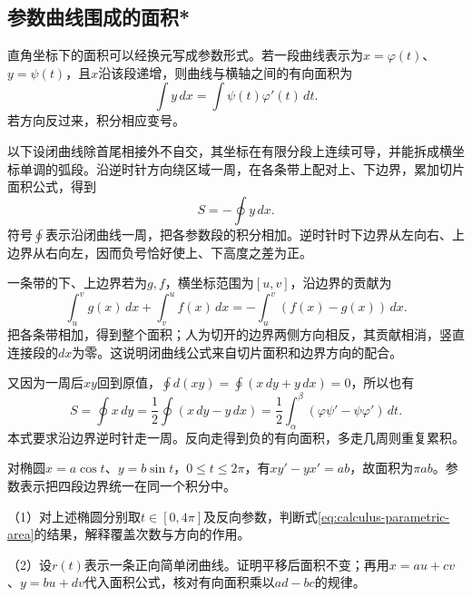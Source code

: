 \endgroup
\FloatBarrier
\newpage
\subsection{参数曲线围成的面积*}

直角坐标下的面积可以经换元写成参数形式。若一段曲线表示为\(x=\varphi(t)\)、\(y=\psi(t)\)，且\(x\)沿该段递增，则曲线与横轴之间的有向面积为
\begin{equation*}
 \int y\,dx=\int\psi(t)\varphi'(t)\,dt.
\end{equation*}
若方向反过来，积分相应变号。

以下设闭曲线除首尾相接外不自交，其坐标在有限分段上连续可导，并能拆成横坐标单调的弧段。沿逆时针方向绕区域一周，在各条带上配对上、下边界，累加切片面积公式，得到
\begin{equation*}
 S=-\oint y\,dx.
\end{equation*}
符号\(\oint\)表示沿闭曲线一周，把各参数段的积分相加。逆时针时下边界从左向右、上边界从右向左，因而负号恰好使上、下高度之差为正。

一条带的下、上边界若为\(g,f\)，横坐标范围为\([u,v]\)，沿边界的贡献为
\begin{equation*}
 \int_u^vg(x)\,dx+\int_v^uf(x)\,dx
 =-\int_u^v(f(x)-g(x))\,dx.
\end{equation*}
把各条带相加，得到整个面积；人为切开的边界两侧方向相反，其贡献相消，竖直连接段的\(dx\)为零。这说明闭曲线公式来自切片面积和边界方向的配合。

又因为一周后\(xy\)回到原值，\(\oint d(xy)=\oint(x\,dy+y\,dx)=0\)，所以也有
\begin{equation}\label{eq:calculus-parametric-area}
 S=\oint x\,dy=\frac12\oint(x\,dy-y\,dx)
 =\frac12\int_\alpha^\beta(\varphi\psi'-\psi\varphi')\,dt.
\end{equation}
本式要求沿边界逆时针走一周。反向走得到负的有向面积，多走几周则重复累积。

对椭圆\(x=a\cos t\)、\(y=b\sin t\)，\(0\le t\le2\pi\)，有\(xy'-yx'=ab\)，故面积为\(\pi ab\)。参数表示把四段边界统一在同一个积分中。

\begin{exercise}
\mbox{}\par\nobreak

（1）对上述椭圆分别取\(t\in[0,4\pi]\)及反向参数，判断式\eqref{eq:calculus-parametric-area}的结果，解释覆盖次数与方向的作用。

（2）设\(r(t)\)表示一条正向简单闭曲线。证明平移后面积不变；再用\(x=au+cv\)、\(y=bu+dv\)代入面积公式，核对有向面积乘以\(ad-bc\)的规律。
\end{exercise}

